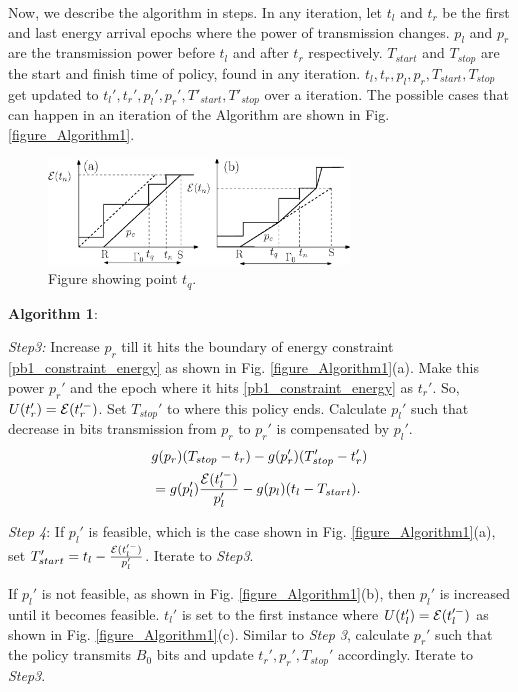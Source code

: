 Now, we describe the algorithm in steps. In any iteration, let $t_{l}$ and $t_{r}$ be the first and last energy arrival epochs where the power of transmission changes. $p_l$ and $p_r$ are the transmission power before $t_l$ and after $t_r$ respectively. $T_{start}$ and $T_{stop}$ are the start and finish time of policy, found in any iteration. $t_l, t_r, p_l, p_r, T_{start}, T_{stop}$ get updated to $t_l', t_r', p_l', p_r', T'_{start}, T'_{stop}$ over a iteration. 
The possible cases that can happen in an iteration of the Algorithm are shown in Fig. \ref{figure_Algorithm1}.
\begin{figure}
\centering
  \centerline{\includegraphics[width=8cm]{straight.eps}}
\caption{Figure showing point $t_q$.}\label{straight}
\end{figure}




\textbf{Algorithm 1}:

\textit{Step3:} Increase $p_r$ till it hits the boundary of energy constraint \eqref{pb1_constraint_energy} as shown in Fig. \ref{figure_Algorithm1}(a). Make this power $p_r'$ and the epoch where it hits \eqref{pb1_constraint_energy} as $t_r'$. So, $U(t_r') = \mathcal{E}(t_r'^-)$. Set $T_{stop}'$ to where this policy ends. Calculate $p_l'$ such that decrease in bits transmission from $p_r$ to $p_r'$ is compensated by $p_l'$.
\begin{align}
&\nonumber g(p_r)(T_{stop}-t_r)-g(p_r')(T_{stop}'-t_r')\\
&=g(p_l')\frac{\ETx(t_l'^-)}{p_l'}-g(p_l)(t_l-T_{start}).
\label{eq_example1}
\end{align}

\textit{Step 4}: If $p_l'$ is feasible, which is the case shown in Fig. \ref{figure_Algorithm1}(a), set $T_{start}'=t_l-\frac{\mathcal{E}(t_l'^-)}{p_l'}$. Iterate to \textit{Step3}. 

If $p_l'$ is not feasible, as shown in Fig. \ref{figure_Algorithm1}(b), then $p_l'$ is increased until it becomes feasible. $t_l'$ is set to the first instance where $U(t_l') = \mathcal{E}(t_l'^-)$ as shown in Fig. \ref{figure_Algorithm1}(c). Similar to \textit{Step 3}, calculate $p_r'$ such that the policy transmits $B_0$ bits and update $t_r',p_r',T_{stop}'$ accordingly. Iterate to \textit{Step3}.




